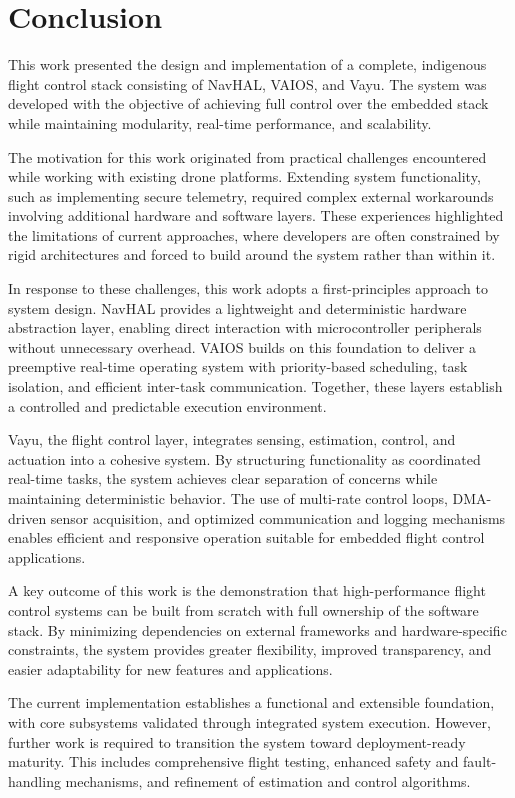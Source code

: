 \chapter{Conclusion}
\label{chap:conclusion}

This work presented the design and implementation of a complete, indigenous flight control stack consisting of NavHAL, VAIOS, and Vayu. The system was developed with the objective of achieving full control over the embedded stack while maintaining modularity, real-time performance, and scalability.

The motivation for this work originated from practical challenges encountered while working with existing drone platforms. Extending system functionality, such as implementing secure telemetry, required complex external workarounds involving additional hardware and software layers. These experiences highlighted the limitations of current approaches, where developers are often constrained by rigid architectures and forced to build around the system rather than within it.

In response to these challenges, this work adopts a first-principles approach to system design. NavHAL provides a lightweight and deterministic hardware abstraction layer, enabling direct interaction with microcontroller peripherals without unnecessary overhead. VAIOS builds on this foundation to deliver a preemptive real-time operating system with priority-based scheduling, task isolation, and efficient inter-task communication. Together, these layers establish a controlled and predictable execution environment.

Vayu, the flight control layer, integrates sensing, estimation, control, and actuation into a cohesive system. By structuring functionality as coordinated real-time tasks, the system achieves clear separation of concerns while maintaining deterministic behavior. The use of multi-rate control loops, DMA-driven sensor acquisition, and optimized communication and logging mechanisms enables efficient and responsive operation suitable for embedded flight control applications.

A key outcome of this work is the demonstration that high-performance flight control systems can be built from scratch with full ownership of the software stack. By minimizing dependencies on external frameworks and hardware-specific constraints, the system provides greater flexibility, improved transparency, and easier adaptability for new features and applications.

The current implementation establishes a functional and extensible foundation, with core subsystems validated through integrated system execution. However, further work is required to transition the system toward deployment-ready maturity. This includes comprehensive flight testing, enhanced safety and fault-handling mechanisms, and refinement of estimation and control algorithms.

